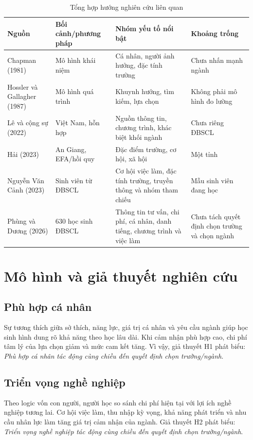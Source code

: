 \begin{table}[H]\centering\caption{Tổng hợp hướng nghiên cứu liên quan}\label{tab:review}
\begin{tabularx}{\textwidth}{p{2.35cm}p{2.75cm}X p{2.0cm}}\toprule
Nguồn & Bối cảnh/phương pháp & Nhóm yếu tố nổi bật & Khoảng trống\\\midrule
Chapman (1981) & Mô hình khái niệm & Cá nhân, người ảnh hưởng, đặc tính trường & Chưa nhấn mạnh ngành\\
Hossler và Gallagher (1987) & Mô hình quá trình & Khuynh hướng, tìm kiếm, lựa chọn & Không phải mô hình đo lường\\
Lê và cộng sự (2022) & Việt Nam, hỗn hợp & Nguồn thông tin, chương trình, khác biệt khối ngành & Chưa riêng ĐBSCL\\
Hải (2023) & An Giang, EFA/hồi quy & Đặc điểm trường, cơ hội, xã hội & Một tỉnh\\
Nguyễn Văn Cảnh (2023) & Sinh viên từ ĐBSCL & Cơ hội việc làm, đặc tính trường, truyền thông và nhóm tham chiếu & Mẫu sinh viên đang học\\
Phùng và Dương (2026) & 630 học sinh ĐBSCL & Thông tin tư vấn, chi phí, cá nhân, danh tiếng, chương trình và việc làm & Chưa tách quyết định chọn trường và chọn ngành\\\bottomrule
\end{tabularx}\end{table}

\section{Mô hình và giả thuyết nghiên cứu}
\subsection{Phù hợp cá nhân}
Sự tương thích giữa sở thích, năng lực, giá trị cá nhân và yêu cầu ngành giúp học sinh hình dung rõ khả năng theo học lâu dài. Khi cảm nhận phù hợp cao, chi phí tâm lý của lựa chọn giảm và mức cam kết tăng. Vì vậy, giả thuyết H1 phát biểu: \textit{Phù hợp cá nhân tác động cùng chiều đến quyết định chọn trường/ngành}.

\subsection{Triển vọng nghề nghiệp}
Theo logic vốn con người, người học so sánh chi phí hiện tại với lợi ích nghề nghiệp tương lai. Cơ hội việc làm, thu nhập kỳ vọng, khả năng phát triển và nhu cầu nhân lực làm tăng giá trị cảm nhận của ngành. Giả thuyết H2 phát biểu: \textit{Triển vọng nghề nghiệp tác động cùng chiều đến quyết định chọn trường/ngành}.

